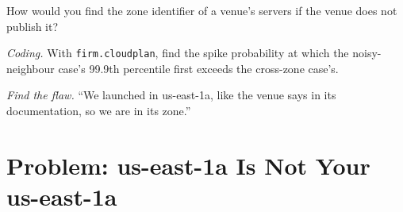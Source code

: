 \begin{exercise}[$\star\star$]\label{exo:nw:trading-in-a-public-cloud:6}
How would you find the zone identifier of a venue's servers if the venue does not publish it?
\end{exercise}

\begin{exercise}[$\star\star\star$]\label{exo:nw:trading-in-a-public-cloud:7}
\emph{Coding.} With \texttt{firm.cloudplan}, find the spike probability at which the noisy-neighbour case's 99.9th percentile first exceeds the cross-zone
case's.
\end{exercise}

\begin{exercise}[$\star\star\star$]\label{exo:nw:trading-in-a-public-cloud:8}
\emph{Find the flaw.} ``We launched in us-east-1a, like the venue says in its documentation, so we are in its zone.''
\end{exercise}

\section{Problem: us-east-1a Is Not Your us-east-1a}

